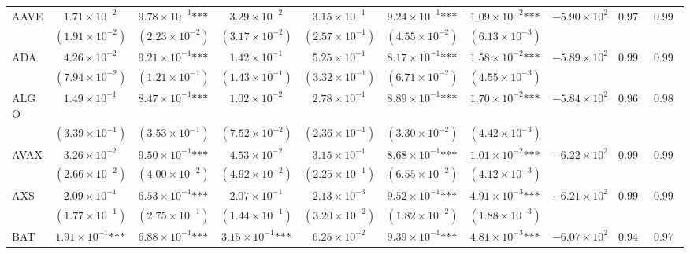 \documentclass{article}
\begin{document}
\begin{landscape}
\begin{longtable}{lccccccccc}
\bottomrule
\endlastfoot
AAVE & $1.71\times 10^{-2}$ & $9.78\times 10^{-1}\text{***}$ & $3.29\times 10^{-2}$ & $3.15\times 10^{-1}$ & $9.24\times 10^{-1}\text{***}$ & $1.09\times 10^{-2}\text{***}$ & $-5.90\times 10^{2}$ & $0.978$ & $0.991$ \\
 & $(1.91\times 10^{-2})$ & $(2.23\times 10^{-2})$ & $(3.17\times 10^{-2})$ & $(2.57\times 10^{-1})$ & $(4.55\times 10^{-2})$ & $(6.13\times 10^{-3})$ &  &  &  \\
ADA & $4.26\times 10^{-2}$ & $9.21\times 10^{-1}\text{***}$ & $1.42\times 10^{-1}$ & $5.25\times 10^{-1}$ & $8.17\times 10^{-1}\text{***}$ & $1.58\times 10^{-2}\text{***}$ & $-5.89\times 10^{2}$ & $0.994$ & $0.996$ \\
 & $(7.94\times 10^{-2})$ & $(1.21\times 10^{-1})$ & $(1.43\times 10^{-1})$ & $(3.32\times 10^{-1})$ & $(6.71\times 10^{-2})$ & $(4.55\times 10^{-3})$ &  &  &  \\
ALGO & $1.49\times 10^{-1}$ & $8.47\times 10^{-1}\text{***}$ & $1.02\times 10^{-2}$ & $2.78\times 10^{-1}$ & $8.89\times 10^{-1}\text{***}$ & $1.70\times 10^{-2}\text{***}$ & $-5.84\times 10^{2}$ & $0.964$ & $0.985$ \\
 & $(3.39\times 10^{-1})$ & $(3.53\times 10^{-1})$ & $(7.52\times 10^{-2})$ & $(2.36\times 10^{-1})$ & $(3.30\times 10^{-2})$ & $(4.42\times 10^{-3})$ &  &  &  \\
AVAX & $3.26\times 10^{-2}$ & $9.50\times 10^{-1}\text{***}$ & $4.53\times 10^{-2}$ & $3.15\times 10^{-1}$ & $8.68\times 10^{-1}\text{***}$ & $1.01\times 10^{-2}\text{***}$ & $-6.22\times 10^{2}$ & $0.997$ & $0.995$ \\
 & $(2.66\times 10^{-2})$ & $(4.00\times 10^{-2})$ & $(4.92\times 10^{-2})$ & $(2.25\times 10^{-1})$ & $(6.55\times 10^{-2})$ & $(4.12\times 10^{-3})$ &  &  &  \\
AXS & $2.09\times 10^{-1}$ & $6.53\times 10^{-1}\text{***}$ & $2.07\times 10^{-1}$ & $2.13\times 10^{-3}$ & $9.52\times 10^{-1}\text{***}$ & $4.91\times 10^{-3}\text{***}$ & $-6.21\times 10^{2}$ & $0.998$ & $0.999$ \\
 & $(1.77\times 10^{-1})$ & $(2.75\times 10^{-1})$ & $(1.44\times 10^{-1})$ & $(3.20\times 10^{-2})$ & $(1.82\times 10^{-2})$ & $(1.88\times 10^{-3})$ &  &  &  \\
BAT & $1.91\times 10^{-1}\text{***}$ & $6.88\times 10^{-1}\text{***}$ & $3.15\times 10^{-1}\text{***}$ & $6.25\times 10^{-2}$ & $9.39\times 10^{-1}\text{***}$ & $4.81\times 10^{-3}\text{***}$ & $-6.07\times 10^{2}$ & $0.942$ & $0.977$ \\

\end{longtable}
\end{landscape}
\end{document}

